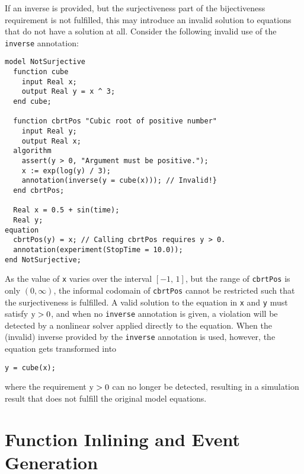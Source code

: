 \begin{example}
If an inverse is provided, but the surjectiveness part of the bijectiveness requirement is not fulfilled, this may introduce an invalid solution to equations that do not have a solution at all.
Consider the following invalid use of the {\lstinline!inverse!} annotation:
\begin{lstlisting}[language=modelica]
model NotSurjective
  function cube
    input Real x;
    output Real y = x ^ 3;
  end cube;

  function cbrtPos "Cubic root of positive number"
    input Real y;
    output Real x;
  algorithm
    assert(y > 0, "Argument must be positive.");
    x := exp(log(y) / 3);
    annotation(inverse(y = cube(x))); // Invalid!}
  end cbrtPos;

  Real x = 0.5 + sin(time);
  Real y;
equation
  cbrtPos(y) = x; // Calling cbrtPos requires y > 0.
  annotation(experiment(StopTime = 10.0));
end NotSurjective;
\end{lstlisting}
As the value of {\lstinline!x!} varies over the interval $[-1,\, 1]$, but the range of {\lstinline!cbrtPos!} is only $(0, \infty)$, the informal codomain of {\lstinline!cbrtPos!} cannot be restricted such that the surjectiveness is fulfilled.
A valid solution to the equation in {\lstinline!x!} and {\lstinline!y!} must satisfy $\text{{\lstinline!y!}} > 0$, and when no {\lstinline!inverse!} annotation is given, a violation will be detected by a nonlinear solver applied directly to the equation.
When the (invalid) inverse provided by the {\lstinline!inverse!} annotation is used, however, the equation gets transformed into
\begin{lstlisting}[language=modelica]
  y = cube(x);
\end{lstlisting}
where the requirement $\text{{\lstinline!y!}} > 0$ can no longer be detected, resulting in a simulation result that does not fulfill the original model equations.
\end{example}
\section{Function Inlining and Event Generation}\label{function-inlining-and-event-generation}

